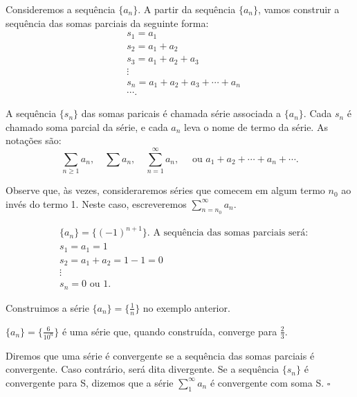 \documentclass[Analysis/analysis_notes.tex]{subfiles}
\begin{document}
 Consideremos a sequ\^encia $\{a_{n}\}$. A partir da sequ\^encia $\{a_{n}\} $, vamos construir a sequ\^encia das somas parciais da seguinte forma: 
\begin{align*}
  &s_{1} = a_{1}\\
  &s_{2} = a_{1} + a_{2}\\
  &s_{3} = a_{1} + a_{2} + a_{3}\\
  &\vdots\\
  &s_{n} = a_{1} + a_{2} + a_{3} + \cdots + a_{n}\\
  &\cdots.
\end{align*}
 \begin{def*}
  A sequ\^encia $\{s_{n}\}$ das somas paricais \'e chamada s\'erie associada a $\{a_{n}\}.$ Cada $s_{n}$ \'e chamado soma parcial da s\'erie, e cada
 $a_{n}$ leva o nome de termo da s\'erie. As nota\c c\~oes s\~ao: 
   $$
   \sum\limits_{n\geq{1}}^{}a_{n},\quad \sum\limits_{}^{}a_{n},\quad \sum\limits_{n=1}^{\infty}a_{n},\quad\text{ ou } a_{1}+a_{2}+\cdots+a_{n}+\cdots.
   $$
 \end{def*}
 Observe que, \`as vezes, consideraremos s\'eries que comecem em algum termo $n_{0}$ ao inv\'es do termo 1. Neste caso, escreveremos 
 $\sum\limits_{n=n_{0}}^{\infty}a_{n}.$
\begin{example}
 \begin{align*}
   &\{a_{n}\} = \{(-1)^{n+1}\}.\text{ A sequ\^encia das somas parciais ser\'a:}\\
   &s_{1} = a_{1} = 1\\
   &s_{2} = a_{1} + a_{2} = 1 - 1 = 0\\
   &\vdots\\
   &s_{n} = 0\text{ ou } 1.
 \end{align*} 
\end{example}
\begin{example}
  Construimos a s\'erie $\{a_{n}\} = \biggl\{\frac{1}{n}\biggr\}$ no exemplo anterior.
\end{example}
\begin{example}
  $\{a_{n}\} = \biggl\{\frac{6}{10^{n}}\biggr\}$ \'e uma s\'erie que, quando constru\'ida, converge para $\frac{2}{3}.$
\end{example}
\begin{def*}
  Diremos que uma s\'erie \'e convergente se a sequ\^encia das somas parciais \'e convergente. Caso contr\'ario, ser\'a dita divergente.
  Se a sequ\^encia $\{s_{n}\} $ \'e convergente para S, dizemos que a s\'erie $\sum\limits_{1}^{\infty}a_{n}$ \'e convergente com soma S. $\square$
\end{def*}
\end{document}
